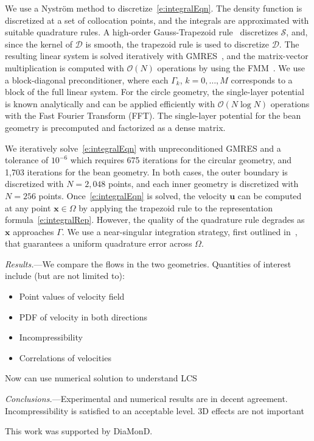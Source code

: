 \documentclass[twocolumn,showpacs,pre,preprintnumbers,floatfix]{revtex4-1}
\newcommand{\uu}{{\mathbf{u}}}
\newcommand{\xx}{{\mathbf{x}}}
\newcommand{\bigO}{{\mathcal{O}}}
\renewcommand{\SS}{{\mathcal{S}}}
\newcommand{\DD}{{\mathcal{D}}}
\begin{document}
We use a Nystr\"{o}m method to discretize~\eqref{e:integralEqn}.  The
density function is discretized at a set of collocation points, and the
integrals are approximated with suitable quadrature rules.  A
high-order Gauss-Trapezoid rule~\cite{alp1999} discretizes $\SS$, and,
since the kernel of $\DD$ is smooth, the trapezoid rule is used to
discretize $\DD$.  The resulting linear system is solved iteratively
with GMRES~\cite{saa:sch1986}, and the matrix-vector multiplication is
computed with $\bigO(N)$ operations by using the FMM~\cite{cmcl2012}.
We use a block-diagonal preconditioner, where each $\Gamma_{k}$,
$k=0,\ldots,M$ corresponds to a block of the full linear system.  For
the circle geometry, the single-layer potential is known analytically
and can be applied efficiently with $\bigO(N \log N)$ operations with
the Fast Fourier Transform (FFT).  The single-layer potential for the
bean geometry is precomputed and factorized as a dense matrix.

We iteratively solve~\eqref{e:integralEqn} with unpreconditioned GMRES
and a tolerance of $10^{-6}$ which requires 675 iterations for the
circular geometry, and 1,703 iterations for the bean geometry.  In both
cases, the outer boundary is discretized with $N = 2,048$ points, and
each inner geometry is discretized with $N = 256$ points.
Once~\eqref{e:integralEqn} is solved, the velocity $\uu$ can be
computed at any point $\xx \in \Omega$ by applying the trapezoid rule
to the representation formula~\eqref{e:integralRep}.  However, the
quality of the quadrature rule degrades as $\xx$ approaches $\Gamma$.
We use a near-singular integration strategy, first outlined
in~\cite{bir:yin:zor2004}, that guarantees a uniform quadrature error
across $\Omega$.




{\em Results.}---We compare the flows in the two geometries.
Quantities of interest include (but are not limited to):
\begin{itemize}
  \item Point values of velocity field
  \item PDF of velocity in both directions
  \item Incompressibility
  \item Correlations of velocities
\end{itemize}

Now can use numerical solution to understand LCS


{\em Conclusions.}---Experimental and numerical results are in decent
agreement.  Incompressibility is satisfied to an acceptable level.  3D
effects are not important




This work was supported by DiaMonD.



\end{document}
